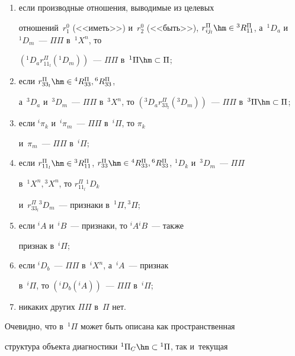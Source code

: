  \begin{enumerate}[(1)]

  \item если производные отношения, выводимые из целевых 

отношений~$r_1^0$ (<<иметь>>) и~$r_2^0$ (<<быть>>), $r^{\Pi}_{ij_l}\hm\in 

{}^3R_{11}^{\Pi}$, а~${}^1 D_a$ и~${}^1D_m$~--- $\Pi\Pi$ в~${}^1X^n$, то 

$({}^1D_a r^{\Pi}_{11_l}({}^1D_m))$~--- $\Pi\Pi$ в~${}^1\Pi\hm\subset \Pi$; 

  \item если $r^{\Pi}_{33_l}\hm\in {}^4R_{33}^{\Pi}, {}^6 R^{\Pi}_{33}$, 

а~${}^3D_a$ и~${}^3D_m$~--- $\Pi\Pi$ в~${}^3 X^n$, то $({}^3 D_a 

r_{33_l}^{\Pi}({}^3D_m))$~--- $\Pi\Pi$ в~${}^3\Pi\hm\subset\Pi$; 

  \item если ${}^i\pi_k$ и~${}^i\pi_m$~--- $\Pi\Pi$ в~${}^i\Pi$, то $\pi_k$ 

и~$\pi_m$~--- $\Pi\Pi$ в~${}^i\Pi$; 

  \item если $r_{11_l}^{\Pi}\hm\in {}^3R_{11}^{\Pi}$, $r_{33}^{\Pi}\hm\in {}^4 

R_{33}^{\Pi}, {}^6R_{33}^{\Pi}$, ${}^1D_k$ и~${}^3D_m$~--- $\Pi\Pi$ 

в~${}^1X^n, {}^3X^n$, то $r_{11_l}^{\Pi}{}^1D_k$ 

и~$r_{33_l}^{\Pi}{}^3D_m$~--- признаки в~${}^1\Pi, {}^3\Pi$;

  \item если ${}^i A$ и~${}^i B$~--- признаки, то ${}^i A{}^i B$~--- также 

признак в~${}^i\Pi$; 

  \item если ${}^i D_b$~--- $\Pi\Pi$ в~${}^iX^n$, а~${}^i A$~--- признак 

в~${}^i\Pi$, то $({}^iD_b({}^i A))$~--- $\Pi\Pi$ в~${}^i\Pi$;

  \item никаких других $\Pi\Pi$ в~$\Pi$ нет.

  \end{enumerate}

  

  Очевидно, что в~${}^1\Pi$ может быть описана как пространственная 

структура объекта диагностики ${}^1\Pi_C\hm\subset {}^1\Pi$, так и~текущая  

